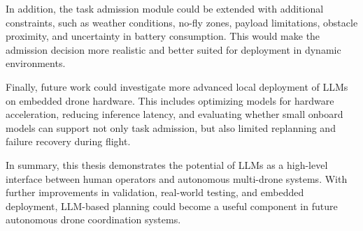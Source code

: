 In addition, the task admission module could be extended with additional constraints, such as weather conditions, no-fly zones, 
payload limitations, obstacle proximity, and uncertainty in battery consumption. This would make the admission decision 
more realistic and better suited for deployment in dynamic environments.

Finally, future work could investigate more advanced local deployment of LLMs on embedded drone hardware. 
This includes optimizing models for hardware acceleration, reducing inference latency, and evaluating whether small onboard 
models can support not only task admission, but also limited replanning and failure recovery during flight.

In summary, this thesis demonstrates the potential of LLMs as a high-level interface between human operators and autonomous 
multi-drone systems. With further improvements in validation, real-world testing, and embedded deployment, LLM-based planning 
could become a useful component in future autonomous drone coordination systems.